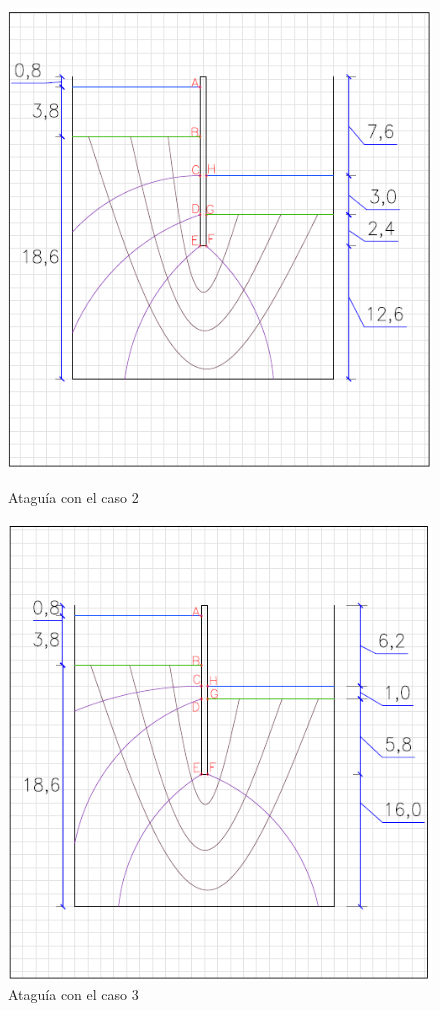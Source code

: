 \documentclass{article}
\begin{document}
\begin{figure}[h]
\begin{minipage}{0.32\textwidth}
        \includegraphics[width=\textwidth]{graficos/At_caso2.png}
        \caption{Ataguía con el caso 2}
        \label{fig:At_caso2}
    \end{minipage}
    \hfill
    \begin{minipage}{0.32\textwidth}
        \centering
        \includegraphics[width=\textwidth]{graficos/At_caso3.png}
        \caption{Ataguía con el caso 3}
        \label{fig:At_caso3}
    \end{minipage}
\end{figure}
\end{document}
